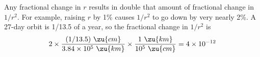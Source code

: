 Any fractional change in $r$ results in double that
amount of fractional change in $1/r^2$. For example, raising
$r$ by 1\% causes $1/r^2$ to go down by very nearly 2\%. 
A 27-day orbit is 1/13.5 of a year, so
the fractional change in $1/r^2$ is
\begin{equation*}
 2 \times \frac{(1/13.5)\ \zu{cm}}{3.84\times10^5\ \zu{km}} 
   \times \frac{1\ \zu{km}}{10^5\ \zu{cm}}
 = 4\times10^{-12}
\end{equation*}
